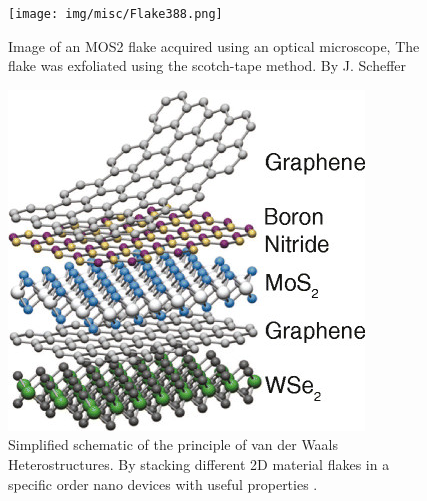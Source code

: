 \documentclass[10pt]{article}
\begin{document}

\begin{figure}[H]
  \centering
  \begin{minipage}[b]{0.58\textwidth}
    \texttt{[image: img/misc/Flake388.png]}
    \caption{Image of an MOS2 flake acquired using an optical microscope, The flake was exfoliated using the scotch-tape method. By J. Scheffer}
    \label{fig:MOS2_flake_joost}
  \end{minipage}
  \hfill
  \begin{minipage}[b]{0.38\textwidth}
    \includegraphics[width=\textwidth]{img/misc/vdws_example.png}
    \caption{Simplified schematic of the principle of van der Waals Heterostructures. By stacking different 2D material flakes in a specific order nano devices with useful properties \cite{jungSurfaceEffectsElectronic2014, geimVanWaalsHeterostructures2013}.}
    \label{fig:heterostack_schematic}
  \end{minipage}
\end{figure}
\end{document}
